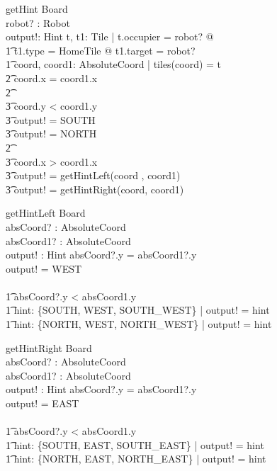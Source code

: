 \documentclass[a4paper,11pt]{article}
\begin{document}
\begin{schema}{getHint}
\Xi Board \\
robot? : Robot \\
output!: Hint
\where
\exists t, t1: Tile | t.occupier = robot? @\\ \t1
t1.type = HomeTile @ t1.target = robot? \\ \t1
\exists coord, coord1: AbsoluteCoord | tiles(coord) = t \\ \t2
\IF coord.x = coord1.x \\ \t2
\THEN \\ \t3
\IF coord.y < coord1.y \\ \t3
\THEN output! = SOUTH \\ \t3
\ELSE output! = NORTH \\ \t2
\ELSE \\ \t3
\IF coord.x > coord1.x \\ \t3
\THEN output! = getHintLeft(coord , coord1) \\ \t3
\ELSE output! = getHintRight(coord, coord1)
\end{schema}

\begin{schema}{getHintLeft}
\Xi Board \\
absCoord? : AbsoluteCoord \\
absCoord1? : AbsoluteCoord \\
output! : Hint 
\where
\IF absCoord?.y = absCoord1?.y \\
\THEN output! = WEST \\
\ELSE \\ \t1
\IF absCoord?.y < absCoord1.y \\ \t1
\THEN \exists hint: \{SOUTH, WEST, SOUTH\_WEST\} | output! = hint \\ \t1
\ELSE \exists hint: \{NORTH, WEST, NORTH\_WEST\} | output! = hint
\end{schema}

\begin{schema}{getHintRight}
\Xi Board \\
absCoord? : AbsoluteCoord \\
absCoord1? : AbsoluteCoord \\
output! : Hint
\where
\IF absCoord?.y = absCoord1?.y \\
\THEN output! = EAST \\
\ELSE \\ \t1
\IF absCoord?.y < absCoord1.y \\ \t1
\THEN \exists hint: \{SOUTH, EAST, SOUTH\_EAST\} | output! = hint \\ \t1
\ELSE \exists hint: \{NORTH, EAST, NORTH\_EAST\} | output! = hint
\end{schema}
\end{document}
